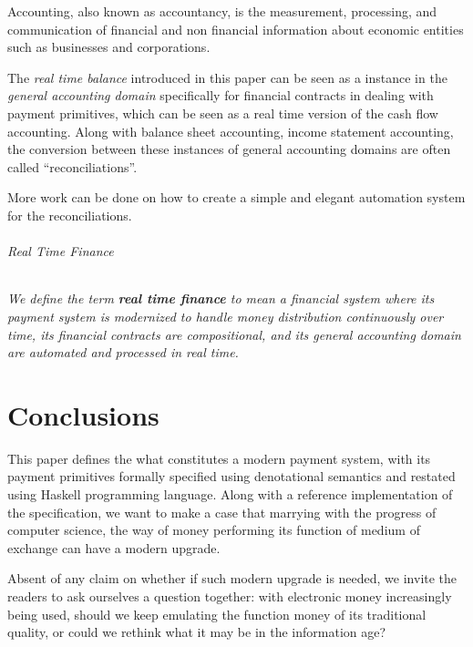 \begin{displayquote}
Accounting, also known as accountancy, is the measurement, processing, and communication of
financial and non financial information about economic entities such as businesses and
corporations. 
\end{displayquote}

The \textit{real time balance} introduced in this paper can be seen as a instance in
the \textit{general accounting domain} specifically for financial contracts in dealing with payment
primitives, which can be seen as a real time version of the cash flow accounting. Along with balance
sheet accounting, income statement accounting, the conversion between these instances of general
accounting domains are often called ``reconciliations''.

More work can be done on how to create a simple and elegant automation system for the
reconciliations.

\paragraph{Real Time Finance}

\emph{
We define the term \textbf{real time finance} to mean a financial system where its payment system is
modernized to handle money distribution continuously over time, its financial contracts are
compositional, and its general accounting domain are automated and processed in real time.  }

\part*{Conclusions}

This paper defines the what constitutes a modern payment system, with its payment primitives
formally specified using denotational semantics and restated using Haskell programming
language. Along with a reference implementation of the specification, we want to make a case that
marrying with the progress of computer science, the way of money performing its function of medium
of exchange can have a modern upgrade.

Absent of any claim on whether if such modern upgrade is needed, we invite the readers to ask
ourselves a question together: with electronic money increasingly being used, should we keep
emulating the function money of its traditional quality, or could we rethink what it may be in the
information age?

